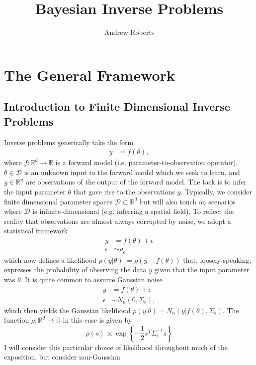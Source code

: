 \documentclass[12pt]{article}
\title{Bayesian Inverse Problems}
\author{Andrew Roberts}
\newcommand{\R}{\mathbb{R}}
\begin{document}
\maketitle
\tableofcontents
\newpage

\section{The General Framework}

\subsection{Introduction to Finite Dimensional Inverse Problems}
Inverse problems generically take the form
\begin{align}
y &= f(\theta),
\end{align}
where $f: \R^d \to \R$ is a forward model (i.e. parameter-to-observation operator), $\theta \in \mathcal{D}$ is an unknown input to the forward model which we seek to learn, and
$y \in \R^n$ are observations of the output of the forward model. The task is to infer the input parameter $\theta$ that gave rise to the observations $y$. Typically, we consider finite
dimensional parameter spaces $\mathcal{D} \subset \R^d$ but will also touch on scenarios where $\mathcal{D}$ is infinite-dimensional (e.g. inferring a spatial field). 
To reflect the reality that 
observations are almost always corrupted by noise, we adopt a statistical framework
\begin{align}
y &= f(\theta) + \epsilon \label{inverse_problem_statistical} \\
\epsilon &\sim \rho_\epsilon \nonumber
\end{align}
which now defines a likelihood $p(y|\theta) := \rho(y - f(\theta))$ that, loosely speaking, expresses the probability of observing the data $y$ given that the input parameter was $\theta$. It is quite common
to assume Gaussian noise 
\begin{align}
y &= f(\theta) + \epsilon \label{inverse_problem_statistical_Gaussian} \\
\epsilon &\sim N_n(0, \Sigma_\epsilon) \nonumber,
\end{align}
which then yields the Gaussian likelihood $p(y|\theta) = N_n(y|f(\theta), \Sigma_\epsilon)$. The function $\rho: \R^d \to \R$ in this case is given by 
\[\rho(s) \propto \exp\left\{-\frac{1}{2} s^T \Sigma_{\epsilon}^{-1} s \right\}\]
 I will consider this particular choice of likelihood throughout much of the exposition, but consider non-Gaussian 
\end{document}
